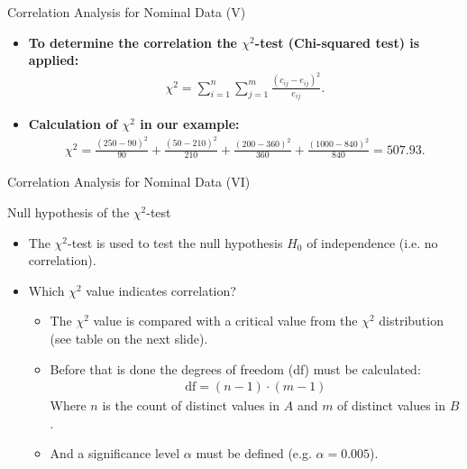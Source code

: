 \begin{frame}{Correlation Analysis for Nominal Data (V)}
	\begin{itemize}
		\item \textbf{To determine the correlation the
				      {\color{airforceblue}$\chi^2$-test} (Chi-squared test) is
			      applied:}
		      \begin{align*}
			      \chi^2 = \sum_{i=1}^{n}\sum_{j=1}^{m}
			      \frac{(c_{ij}-e_{ij})^2}{e_{ij}}.
		      \end{align*}

		\item \textbf{Calculation of $\chi^2$ in our example:}
		      \begin{align*}
			      \chi^2 = \frac{(250-90)^2}{90} + \frac{(50-210)^2}{210} +
			      \frac{(200-360)^2}{360} + \frac{(1000-840)^2}{840} = 507.93.
		      \end{align*}


	\end{itemize}
\end{frame}

\begin{frame}{Correlation Analysis for Nominal Data (VI)}
	\begin{block}{Null hypothesis of the $\chi^2$-test}
		\begin{itemize}
			\item The $\chi^2$-test is used to test the null hypothesis $H_0$ of independence (i.e. no correlation).
		\end{itemize}
	\end{block}

	\begin{itemize}
		\item Which $\chi^2$ value indicates correlation?
		      \begin{itemize}
			      \item The $\chi^2$ value is compared with a critical value from the
			            $\chi^2$ distribution (see table on the next slide).
			      \item Before that is done the degrees of freedom (df) must be
			            calculated:
			            \begin{align*}
				            \text{df} = (n-1) \cdot (m-1)
			            \end{align*}
			            Where $n$ is the count of distinct values in $A$ and $m$ of distinct values in $B$.
			      \item And a significance level $\alpha$ must be defined (e.g. $\alpha = 0.005$).
		      \end{itemize}
	\end{itemize}
\end{frame}

